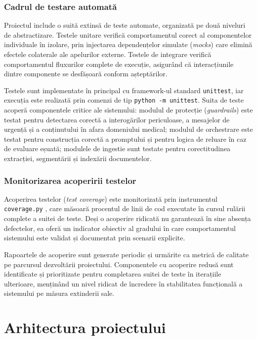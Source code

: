 \documentclass[12pt, a4paper, oneside, romanian]{teza-upb}
\begin{document}
\subsection{Cadrul de testare automată}

Proiectul include o suită extinsă de teste automate, organizată pe două niveluri de abstractizare. Testele unitare verifică comportamentul corect al componentelor individuale în izolare, prin injectarea dependențelor simulate (\textit{mocks}) care elimină efectele colaterale ale apelurilor externe. Testele de integrare verifică comportamentul fluxurilor complete de execuție, asigurând că interacțiunile dintre componente se desfășoară conform așteptărilor.

Testele sunt implementate în principal cu framework-ul standard \texttt{unittest}, iar execuția este realizată prin comenzi de tip \texttt{python -m unittest}. Suita de teste acoperă componentele critice ale sistemului: modulul de protecție (\textit{guardrails}) este testat pentru detectarea corectă a interogărilor periculoase, a mesajelor de urgență și a conținutului în afara domeniului medical; modulul de orchestrare este testat pentru construcția corectă a promptului și pentru logica de reluare în caz de evaluare eșuată; modulele de ingestie sunt testate pentru corectitudinea extracției, segmentării și indexării documentelor.

\subsection{Monitorizarea acoperirii testelor}

Acoperirea testelor (\textit{test coverage}) este monitorizată prin instrumentul \texttt{coverage.py} \cite{coveragepy_doc}, care măsoară procentul de linii de cod executate în cursul rulării complete a suitei de teste. Deși o acoperire ridicată nu garantează în sine absența defectelor, ea oferă un indicator obiectiv al gradului în care comportamentul sistemului este validat și documentat prin scenarii explicite.

Rapoartele de acoperire sunt generate periodic și urmărite ca metrică de calitate pe parcursul dezvoltării proiectului. Componentele cu acoperire redusă sunt identificate și prioritizate pentru completarea suitei de teste în iterațiile ulterioare, menținând un nivel ridicat de încredere în stabilitatea funcțională a sistemului pe măsura extinderii sale.

\chapter{Arhitectura proiectului}
\end{document}
